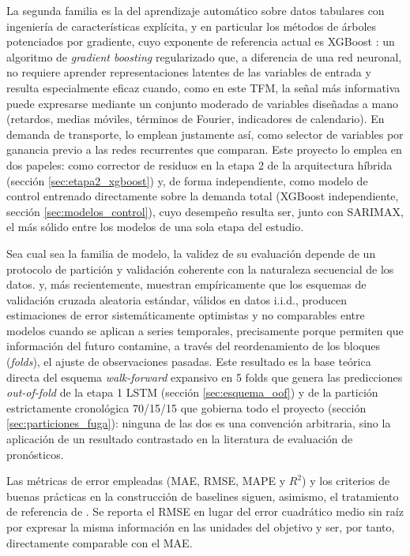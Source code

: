 La segunda familia es la del aprendizaje automático sobre datos tabulares con ingeniería
de características explícita, y en particular los métodos de árboles potenciados por
gradiente, cuyo exponente de referencia actual es XGBoost \parencite{chen2016xgboost}: un
algoritmo de \emph{gradient boosting} regularizado que, a diferencia de una red neuronal,
no requiere aprender representaciones latentes de las variables de entrada y resulta
especialmente eficaz cuando, como en este TFM, la señal más informativa puede expresarse
mediante un conjunto moderado de variables diseñadas a mano (retardos, medias móviles,
términos de Fourier, indicadores de calendario). En demanda de transporte,
\textcite{yazicioglu2025passenger} lo emplean justamente así, como selector de variables
por ganancia previo a las redes recurrentes que comparan. Este proyecto lo emplea en dos
papeles: como corrector de residuos en la etapa 2 de la arquitectura híbrida (sección
\ref{sec:etapa2_xgboost}) y, de forma independiente, como modelo de control entrenado
directamente sobre la demanda total (XGBoost independiente, sección
\ref{sec:modelos_control}), cuyo desempeño resulta ser, junto con SARIMAX, el más sólido
entre los modelos de una sola etapa del estudio.

Sea cual sea la familia de modelo, la validez de su evaluación depende de un protocolo de
partición y validación coherente con la naturaleza secuencial de los datos.
\textcite{bergmeir2012cv} y, más recientemente, \textcite{cerqueira2020evaluating}
muestran empíricamente que los esquemas de validación cruzada aleatoria estándar, válidos
en datos i.i.d., producen estimaciones de error sistemáticamente optimistas y no
comparables entre modelos cuando se aplican a series temporales, precisamente porque
permiten que información del futuro contamine, a través del reordenamiento de los
bloques (\emph{folds}), el ajuste de observaciones pasadas. Este resultado es la base
teórica directa del esquema \emph{walk-forward} expansivo en 5 folds que genera las
predicciones \emph{out-of-fold} de la etapa 1 LSTM (sección \ref{sec:esquema_oof}) y de
la partición estrictamente cronológica 70/15/15 que gobierna todo el proyecto (sección
\ref{sec:particiones_fuga}): ninguna de las dos es una convención arbitraria, sino la
aplicación de un resultado contrastado en la literatura de evaluación de pronósticos.

Las métricas de error empleadas (MAE, RMSE, MAPE y $R^2$) y los criterios de buenas
prácticas en la construcción de baselines siguen, asimismo, el tratamiento de referencia
de \textcite{hyndman2021fpp}. Se reporta el RMSE en lugar del error cuadrático medio sin
raíz por expresar la misma información en las unidades del objetivo y ser, por tanto,
directamente comparable con el MAE.

